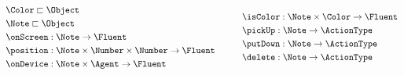 \begin{equation*}
    \begin{aligned}\
        & \Color \sqsubset \Object \\
        & \Note \sqsubset \Object \\
        & \onScreen: \Note \rightarrow \Fluent \\
        & \position: \Note \times \Number \times \Number \rightarrow \Fluent \\ 
        & \onDevice: \Note \times \Agent \rightarrow \Fluent \\
    \end{aligned}
    \hspace{30pt}
    \begin{aligned}
        & \isColor: \Note \times \Color \rightarrow \Fluent \\
        & \pickUp: \Note \rightarrow \ActionType \\
        & \putDown: \Note \rightarrow \ActionType \\
        & \delete: \Note \rightarrow \ActionType \\ 
    \end{aligned}
\end{equation*}